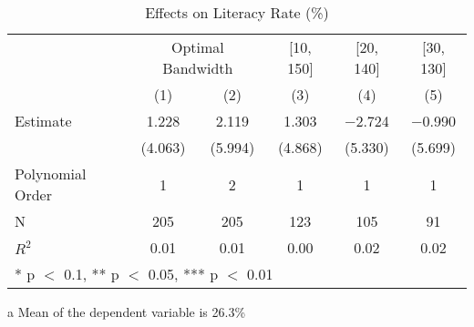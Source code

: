 \begin{table}[!h]

\caption{Effects on Literacy Rate (\%) \label{tab:rdd_literacy_1872}}
\centering
\begin{threeparttable}
\begin{tabular}[t]{lccccc}
\toprule
\multicolumn{1}{c}{} & \multicolumn{2}{c}{Optimal Bandwidth} & \multicolumn{1}{c}{[10, 150]} & \multicolumn{1}{c}{[20, 140]} & \multicolumn{1}{c}{[30, 130]} \\
\cmidrule(l{3pt}r{3pt}){2-3} \cmidrule(l{3pt}r{3pt}){4-4} \cmidrule(l{3pt}r{3pt}){5-5} \cmidrule(l{3pt}r{3pt}){6-6}
  & (1) & (2) & (3) & (4) & (5)\\
\midrule
Estimate & \num{1.228} & \num{2.119} & \num{1.303} & \num{-2.724} & \num{-0.990}\\
 & (\num{4.063}) & (\num{5.994}) & (\num{4.868}) & (\num{5.330}) & (\num{5.699})\\

\midrule
Polynomial Order & 1 & 2 & 1 & 1 & 1\\
N & \num{205} & \num{205} & \num{123} & \num{105} & \num{91}\\
$R^2$ & \num{0.01} & \num{0.01} & \num{0.00} & \num{0.02} & \num{0.02}\\
\bottomrule
\multicolumn{6}{l}{\rule{0pt}{1em}* p $<$ 0.1, ** p $<$ 0.05, *** p $<$ 0.01}\\
\end{tabular}
\begin{tablenotes}
\item[a] Mean of the dependent variable is 26.3\%
\end{tablenotes}
\end{threeparttable}
\end{table}
